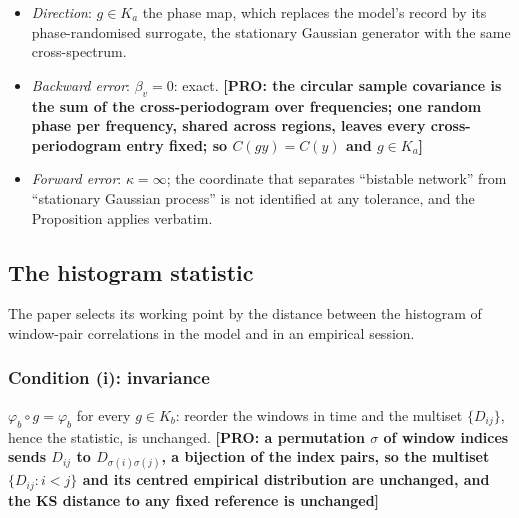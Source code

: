 \documentclass[11pt]{article}
\newcommand{\PRO}[1]{\textcolor{blue!55!black}{\textbf{[PRO: #1]}}}
\begin{document}
\begin{itemize}
\begin{itemize}
  \item \emph{Direction}: $g\in K_a$ the phase map, which replaces the model's record by its phase-randomised surrogate, the stationary Gaussian generator with the same cross-spectrum.
  \item \emph{Backward error}: $\beta_v=0$: exact. \PRO{the circular sample covariance is the sum of the cross-periodogram over frequencies; one random phase per frequency, shared across regions, leaves every cross-periodogram entry fixed; so $C(gy)=C(y)$ and $g\in K_a$}
  \item \emph{Forward error}: $\kappa=\infty$; the coordinate that separates ``bistable network'' from ``stationary Gaussian process'' is not identified at any tolerance, and the Proposition applies verbatim.
  \end{itemize}
\end{itemize}

\subsection{The histogram statistic}
The paper selects its working point by the distance between the histogram of window-pair correlations in the model and in an empirical session.
\subsubsection{Condition (i): invariance}
$\varphi_b\circ g=\varphi_b$ for every $g\in K_b$: reorder the windows in time and the multiset $\{D_{ij}\}$, hence the statistic, is unchanged. \PRO{a permutation $\sigma$ of window indices sends $D_{ij}$ to $D_{\sigma(i)\sigma(j)}$, a bijection of the index pairs, so the multiset $\{D_{ij}:i<j\}$ and its centred empirical distribution are unchanged, and the KS distance to any fixed reference is unchanged}
\end{document}
